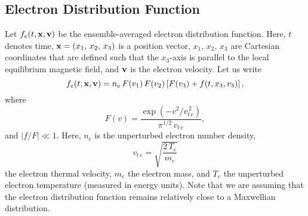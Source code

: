 \documentclass[12pt,prb,aps]{revtex4-1}
\begin{document}
\subsection{Electron Distribution Function}
Let $f_e(t,{\bf x},{\bf v})$ be the ensemble-averaged electron distribution function. Here, $t$ denotes time, ${\bf x}=(x_1,\, x_2,\, x_3)$
is a position vector,  $x_1$, $x_2$, $x_3$ are Cartesian coordinates that are defined such that the 
$x_3$-axis is parallel to the local equilibrium magnetic field, and ${\bf v}$ is the electron velocity. 
Let us write
\begin{equation}\label{e22}
f_e(t,{\bf x},{\bf v})= n_e\,F(v_1)\,F(v_2)\left[F(v_3)+ f (t,x_3,v_3)\right],
\end{equation}
where 
\begin{equation}
F(v) = \frac{\exp(-v^2/v_{t\,e}^{\,2})}{\pi^{1/2}\,v_{t\,e}},
\end{equation}
and 
$|f/F|\ll 1$. Here,  $n_e$ is the unperturbed electron number density, 
\begin{equation}
v_{t\,e} = \sqrt{\frac{2\,T_e}{m_e}}
\end{equation}
the electron thermal velocity, $m_e$  the electron mass,  and $T_e$ the unperturbed electron temperature (measured in energy units). Note that we are assuming that the electron distribution function remains relatively close to a Maxwellian distribution. 
\end{document}
